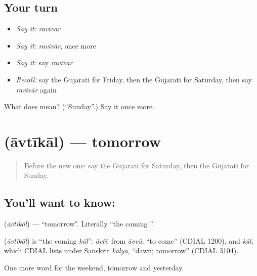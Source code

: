 \subsection*{Your turn}
\begin{itemize}
\raggedright
  \item \emph{Say it:} \emph{ravivār}
  \item \emph{Say it:} \emph{ravivār}, once more
  \item \emph{Say it:} say \emph{ravivār}
  \item \emph{Recall:} say the Gujarati for Friday, then the Gujarati for Saturday, then say \emph{ravivār} again
\end{itemize}

\begin{tcolorbox}[breakable,colback=teal!4,colframe=teal!35!black,title={Before you move on}]
What does  mean? (\textquotedblleft{}Sunday\textquotedblright{}.) Say it once more.
\end{tcolorbox}
\section[\texorpdfstring{\gu{આવતીકાલ} (āvtīkāl)}{આવતીકાલ (āvtīkāl)}]{ (āvtīkāl) — tomorrow}

\label{lesson:GU-C79-tomorrow}



\begin{quote}
Before the new one: say the Gujarati for Saturday, then the Gujarati for Sunday.
\end{quote}

\subsection*{You'll want to know: }
\textbf{} (\emph{āvtīkāl}) — \textquotedblleft{}tomorrow\textquotedblright{}. Literally \textquotedblleft{}the coming \textbf{}\textquotedblright{}.

\begin{cousinweb}
\textbf{} (\emph{āvtīkāl}) is \textquotedblleft{}the coming \emph{kāl}\textquotedblright{}: \emph{āvtī}, from \emph{āvvũ}, \textquotedblleft{}to come\textquotedblright{} (CDIAL 1200), and \emph{kāl}, which CDIAL lists under Sanskrit \emph{kalya}, \textquotedblleft{}dawn; tomorrow\textquotedblright{} (CDIAL 3104).
\end{cousinweb}

\begin{grammarlens}[title={What you've built}]
One more word for the weekend, tomorrow and yesterday.
\end{grammarlens}

